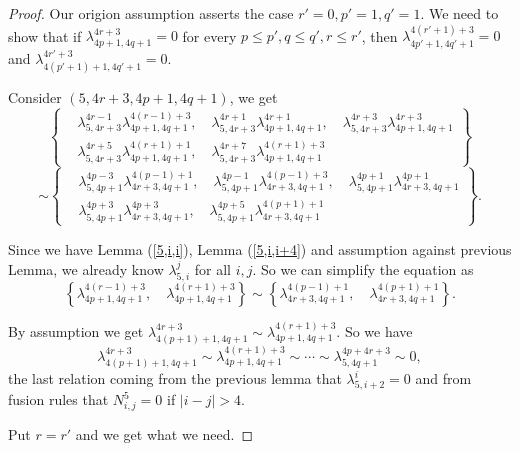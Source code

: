 \documentclass[10pt,a4paper]{amsart}
\begin{document}
\begin{proof}
Our origion assumption asserts the case $r'=0,p'=1,q'=1$.
We need to show that if $\lambda_{4p+1,4q+1}^{4r+3}=0$ for every $p\leq p',q\leq q',r\leq r'$,
then $\lambda_{4p'+1,4q'+1}^{4(r'+1)+3}=0$ and  $\lambda_{4(p'+1)+1,4q'+1}^{4r'+3}=0$.

Consider $(5,4r+3,4p+1,4q+1)$,
we get
$$\left\{\begin{aligned}
&\lambda_{5,4r+3}^{4r-1}\lambda_{4p+1,4q+1}^{4(r-1)+3},\quad
\lambda_{5,4r+3}^{4r+1}\lambda_{4p+1,4q+1}^{4r+1},\quad
\lambda_{5,4r+3}^{4r+3}\lambda_{4p+1,4q+1}^{4r+3}\\
&\lambda_{5,4r+3}^{4r+5}\lambda_{4p+1,4q+1}^{4(r+1)+1},\quad
\lambda_{5,4r+3}^{4r+7}\lambda_{4p+1,4q+1}^{4(r+1)+3}
\end{aligned}\right\}
$$
$$
\sim\left\{\begin{aligned}
 & \lambda_{5,4p+1}^{4p-3}\lambda_{4r+3,4q+1}^{4(p-1)+1},\quad
\lambda_{5,4p+1}^{4p-1}\lambda_{4r+3,4q+1}^{4(p-1)+3},\quad
\lambda_{5,4p+1}^{4p+1}\lambda_{4r+3,4q+1}^{4p+1}\\
&\lambda_{5,4p+1}^{4p+3}\lambda_{4r+3,4q+1}^{4p+3},\quad
\lambda_{5,4p+1}^{4p+5}\lambda_{4r+3,4q+1}^{4(p+1)+1}
\end{aligned}
\right\}.
$$

Since we have Lemma (\ref{5,i,i}), Lemma (\ref{5,i,i+4}) and assumption against previous Lemma,
we already know $\lambda_{5,i}^j$ for all $i,j$.
So we can simplify the equation as
$$\left\{\lambda_{4p+1,4q+1}^{4(r-1)+3},\quad
\lambda_{4p+1,4q+1}^{4(r+1)+3}
\right\}
\sim 
\left\{\lambda_{4r+3,4q+1}^{4(p-1)+1},\quad
\lambda_{4r+3,4q+1}^{4(p+1)+1}\right\}.$$

By assumption we get $\lambda_{4(p+1)+1,4q+1}^{4r+3}\sim\lambda_{4p+1,4q+1}^{4(r+1)+3}$.
So we have
$$\lambda_{4(p+1)+1,4q+1}^{4r+3}\sim\lambda_{4p+1,4q+1}^{4(r+1)+3}\sim\cdots\sim\lambda_{5,4q+1}^{4p+4r+3}\sim 0,$$
the last relation coming from the previous lemma that
$\lambda_{5,i+2}^i=0$
and from fusion rules that $N_{i,j}^5=0$ if $|i-j|>4$.

Put $r=r'$ and we get what we need.
\end{proof}
\end{document}
